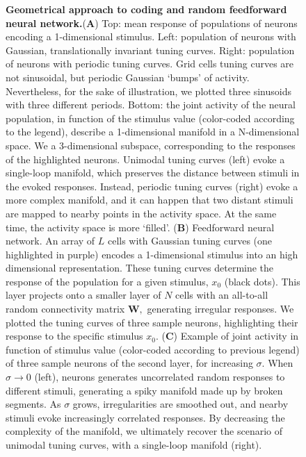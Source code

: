 \documentclass[a4paper]{article}%
\begin{document}


\newpage\begin{figure}[ptb]
\centering
{}\caption{\textbf{Geometrical
approach to coding and random feedforward neural network.}(\textbf{A}) Top:
mean response of populations of neurons encoding a 1-dimensional stimulus.
Left: population of neurons with Gaussian, translationally invariant tuning
curves. Right: population of neurons with periodic tuning curves. Grid cells
tuning curves are not sinusoidal, but periodic Gaussian `bumps' of activity.
Nevertheless, for the sake of illustration, we plotted three sinusoids with
three different periods. Bottom: the joint activity of the neural population,
in function of the stimulus value (color-coded according to the legend),
describe a 1-dimensional manifold in a N-dimensional space. We a 3-dimensional
subspace, corresponding to the responses of the highlighted neurons. Unimodal
tuning curves (left) evoke a single-loop manifold, which preserves the
distance between stimuli in the evoked responses. Instead, periodic tuning
curves (right) evoke a more complex manifold, and it can happen that two
distant stimuli are mapped to nearby points in the activity space. At the same
time, the activity space is more `filled'. (\textbf{B}) Feedforward neural
network. An array of $L$ cells with Gaussian tuning curves (one highlighted in
purple) encodes a 1-dimensional stimulus into an high dimensional
representation. These tuning curves determine the response of the population
for a given stimulus, $x_{0}$ (black dots). This layer projects onto a smaller
layer of $N$ cells with an all-to-all random connectivity matrix $\mathbf{W},$
generating irregular responses. We plotted the tuning curves of three sample
neurons, highlighting their response to the specific stimulus $x_{0}$.
(\textbf{C}) Example of joint activity in function of stimulus value
(color-coded according to previous legend) of three sample neurons of the
second layer, for increasing $\sigma$. When $\sigma\rightarrow0$ (left),
neurons generates uncorrelated random responses to different stimuli,
generating a spiky manifold made up by broken segments. As $\sigma$ grows,
irregularities are smoothed out, and nearby stimuli evoke increasingly
correlated responses. By decreasing the complexity of the manifold, we
ultimately recover the scenario of unimodal tuning curves, with a single-loop
manifold (right).}%
\label{Fig:1}%
\end{figure}\clearpage
\end{document}
